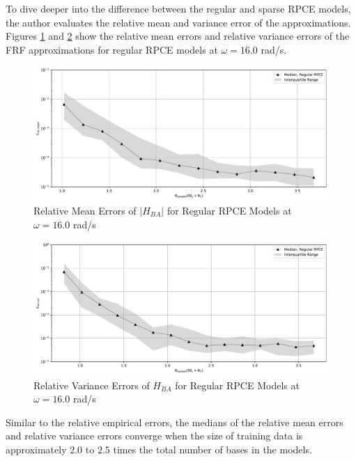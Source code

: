 To dive deeper into the difference between the regular and sparse RPCE models, the author evaluates the relative mean and variance error of the approximations.
Figures \ref{mean_rRPCE_B_A_16} and \ref{var_rRPCE_B_A_16} show the relative mean errors and relative variance errors of the FRF approximations for regular RPCE models at $\omega=16.0$ rad/s.
\begin{figure}[H]
    \centering
    \includegraphics[width=1.0\textwidth]{
        plots/surrogate/plot_2P_B_16.pdf
    }
    \caption{%
        Relative Mean Errors of $\left|H_{BA}\right|$ for Regular RPCE Models at $\omega=16.0$ rad/s
    }
    \label{mean_rRPCE_B_A_16}
\end{figure}
\begin{figure}[H]
    \centering
    \includegraphics[width=1.0\textwidth]{
        plots/surrogate/plot_3P_B_16.pdf
    }
    \caption{%
        Relative Variance Errors of $H_{BA}$ for Regular RPCE Models at $\omega=16.0$ rad/s
    }
    \label{var_rRPCE_B_A_16}
\end{figure}
Similar to the relative empirical errors, the medians of the relative mean errors and relative variance errors converge when the size of training data is approximately $2.0$ to $2.5$ times the total number of bases in the models.

